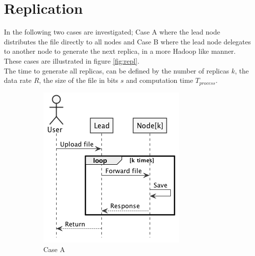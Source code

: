 \section{Replication} \label{sec:repl}
In the following two cases are investigated; Case A where the lead node distributes the file directly to all nodes and Case B where the lead node delegates to another node to generate the next replica, in a more Hadoop like manner. These cases are illustrated in figure \ref{fig:repl}. \\
The time to generate all replicas, can be defined by the number of replicas $k$, the data rate $R$, the size of the file in bits $s$ and computation time $T_{process}$. 

\begin{figure}[H]
    \centering
    \begin{subfigure}{.35\textwidth}
        \includegraphics[width=\textwidth]{figures/e2a.png}
        \caption{Case A}
    \end{subfigure}
    \hspace{30px}
    \begin{subfigure}{.42\textwidth}

\end{subfigure}
\end{figure}
